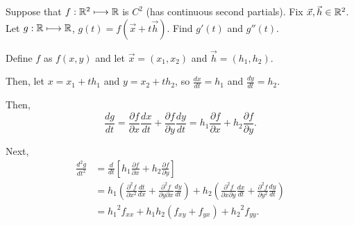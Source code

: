\documentclass{article}
\begin{document}
  \begin{problem}
    Suppose that $f:\mathbb{R}^2\longmapsto\mathbb{R}$ is $C^2$ (has continuous second partials). Fix $\vec{x},\vec{h}\in \mathbb{R}^2$. Let $g:\mathbb{R}\longmapsto\mathbb{R}$, $g(t)=f(\vec{x}+t\vec{h})$. Find $g'(t)$ and $g''(t)$.
  \end{problem}

  Define $f$ as $f(x,y)$ and let $\vec{x}=(x_1,x_2)$ and $\vec{h}=(h_1,h_2)$.

  Then, let $x=x_1+th_1$ and $y=x_2+th_2$, so $\frac{dx}{dt}=h_1$ and $\frac{dy}{dt}=h_2$.

  Then, \[
  \frac{dg}{dt}=\frac{\partial f}{\partial x}\frac{dx}{dt}+\frac{\partial f}{\partial y}\frac{dy}{dt}=h_1 \frac{\partial f}{\partial x}+h_2 \frac{\partial f}{\partial y}
  .\] 

  Next, \begin{align*}
    \frac{d^2 g}{dt^2}&=\frac{d}{dt}\left[ h_1 \frac{\partial f}{\partial x}+h_2 \frac{\partial f}{\partial y} \right] \\
                      &= h_1\left( \frac{\partial^2 f}{\partial x^2} \frac{dt}{dx} + \frac{\partial^2 f}{\partial y \partial x}\frac{dy}{dt} \right) + h_2\left( \frac{\partial^2 f}{\partial x \partial y}\frac{dx}{dt} + \frac{\partial^2 f}{\partial y^2}\frac{dy}{dt} \right) \\
                      &= {h_1}^2 f_{xx}+h_1h_2(f_{xy}+f_{yx})+{h_2}^2 f_{yy}. \\
  \end{align*}
\end{document}
